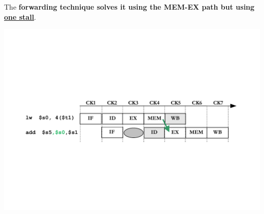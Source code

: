 \begin{itemize}
\begin{examplebox}
        The \textbf{forwarding technique solves it using the MEM-EX path but using \underline{one stall}}.
        \begin{center}
            \includegraphics[width=\textwidth]{img/load-use-hazard-problem-2.pdf}
        \end{center}
    \end{examplebox}


\end{itemize}
